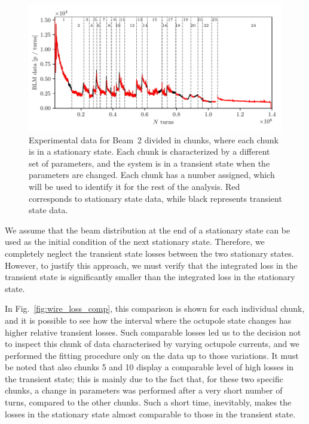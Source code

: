 \begin{figure}[th]
    \centering
    \includegraphics[width=1.0\textwidth]{5_wire_compensators_LHC/figs/chunks_names.pdf}
    \caption{Experimental data for Beam~2 divided in chunks, where each chunk is in a stationary state. Each chunk is characterized by a different set of parameters, and the system is in a transient state when the parameters are changed. Each chunk has a number assigned, which will be used to identify it for the rest of the analysis. Red corresponds to stationary state data, while black represents transient state data.}
    \label{fig:chunks}
\end{figure}

We assume that the beam distribution at the end of a stationary state can be used as the initial condition of the next stationary state. Therefore, we completely neglect the transient state losses between the two stationary states. However, to justify this approach, we must verify that the integrated loss in the transient state is significantly smaller than the integrated loss in the stationary state.

In Fig.~\ref{fig:wire_loss_comp}, this comparison is shown for each individual chunk, and it is possible to see how the interval where the octupole state changes has higher relative transient losses. Such comparable losses led us to the decision not to inspect this chunk of data characterised by varying octupole currents, and we performed the fitting procedure only on the data up to those variations. It must be noted that also chunks 5 and 10 display a comparable level of high losses in the transient state; this is mainly due to the fact that, for these two specific chunks, a change in parameters was performed after a very short number of turns, compared to the other chunks. Such a short time, inevitably, makes the losses in the stationary state almost comparable to those in the transient state. 


